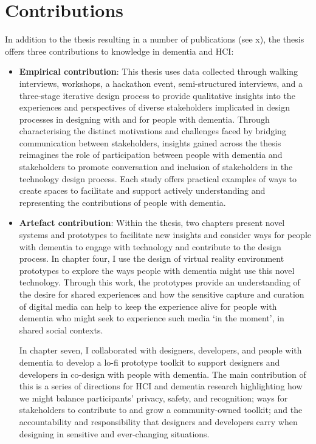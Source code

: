 \section{Contributions}
\label{Intro:Contribution}
In addition to the thesis resulting in a number of publications (see x), the thesis offers three contributions to knowledge in dementia and HCI:

\begin{itemize}
    \item \textbf{Empirical contribution}: This thesis uses data collected through walking interviews, workshops, a hackathon event, semi-structured interviews, and a three-stage iterative design process to provide qualitative insights into the experiences and perspectives of diverse stakeholders implicated in design processes in designing with and for people with dementia. Through characterising the distinct motivations and challenges faced by bridging communication between stakeholders, insights gained across the thesis reimagines the role of participation between people with dementia and stakeholders to promote conversation and inclusion of stakeholders in the technology design process. Each study offers practical examples of ways to create spaces to facilitate and support actively understanding and representing the contributions of people with dementia. 

    
    \item \textbf{Artefact contribution}: Within the thesis, two chapters present novel systems and prototypes to facilitate new insights and consider ways for people with dementia to engage with technology and contribute to the design process. In chapter four, I use the design of virtual reality environment prototypes to explore the ways people with dementia might use this novel technology. Through this work, the prototypes provide an understanding of the desire for shared experiences and how the sensitive capture and curation of digital media can help to keep the experience alive for people with dementia who might seek to experience such media `in the moment', in shared social contexts.
    
    In chapter seven, I collaborated with designers, developers, and people with dementia to develop a lo-fi prototype toolkit to support designers and developers in co-design with people with dementia. The main contribution of this is a series of directions for HCI and dementia research highlighting how we might balance participants’ privacy, safety, and recognition; ways for stakeholders to contribute to and grow a community-owned toolkit; and the accountability and responsibility that designers and developers carry when designing in sensitive and ever-changing situations.


\end{itemize}
